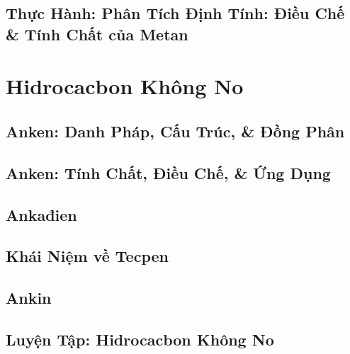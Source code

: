 \documentclass[oneside]{book}
\numberwithin{equation}{section}
\begin{document}

\section{Thực Hành: Phân Tích Định Tính: Điều Chế \& Tính Chất của Metan}


\chapter{Hidrocacbon Không No}

\section{Anken: Danh Pháp, Cấu Trúc, \& Đồng Phân}


\section{Anken: Tính Chất, Điều Chế, \& Ứng Dụng}


\section{Ankađien}


\section{Khái Niệm về Tecpen}


\section{Ankin}


\section{Luyện Tập: Hidrocacbon Không No}
\end{document}
